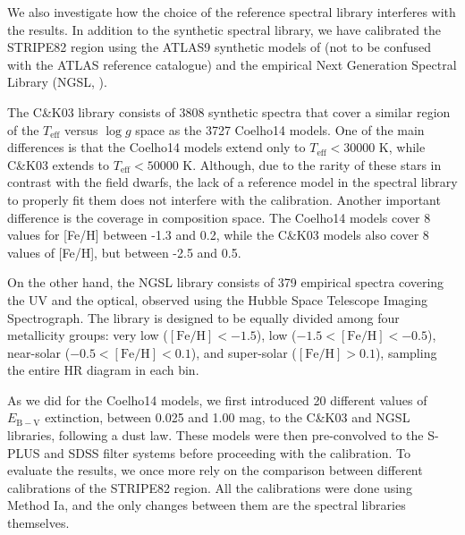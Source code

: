 \documentclass[fleqn,usenatbib]{mnras}
\begin{document}
We also investigate how the choice of the reference spectral library interferes with the results. In addition to the  synthetic spectral library, we have calibrated the STRIPE82 region using the ATLAS9 synthetic models of  (not to be confused with the ATLAS reference catalogue) and the empirical Next Generation Spectral Library (NGSL, \citealp{Gregg+2006, Heap2007}).

The C\&K03 library consists of 3808 synthetic spectra that cover a similar region of the $T_\mathrm{eff}$ versus $\log g$ space as the 3727 Coelho14 models. One of the main differences is that the Coelho14 models extend only to $T_\mathrm{eff} < 30000$ K, while C\&K03 extends to $T_\mathrm{eff} < 50000$ K. Although, due to the rarity of these stars in contrast with the field dwarfs, the lack of a reference model in the spectral library to properly fit them does not interfere with the calibration. Another important difference is the coverage in composition space. The Coelho14 models cover 8 values for [Fe/H] between -1.3 and 0.2, while the C\&K03 models also cover 8 values of [Fe/H], but between -2.5 and 0.5. 

On the other hand, the NGSL library consists of 379 empirical spectra covering the UV and the optical, observed using the Hubble Space Telescope Imaging Spectrograph. The library is designed to be equally divided among four metallicity groups: very low ($\mathrm{[Fe/H]} < -1.5$), low ($-1.5 < \mathrm{[Fe/H]} < -0.5$), near-solar ($-0.5 < \mathrm{[Fe/H]} < 0.1$), and super-solar ($\mathrm{[Fe/H]} > 0.1$), sampling the entire HR diagram in each bin.

As we did for the Coelho14 models, we first introduced 20 different values of $E_\mathrm{B-V}$ extinction, between 0.025 and 1.00 mag, to the C\&K03 and NGSL libraries, following a \citet{Cardelli+1989} dust law. These models were then pre-convolved to the S-PLUS and SDSS filter systems before proceeding with the calibration. To evaluate the results, we once more rely on the comparison between different calibrations of the STRIPE82 region. All the calibrations were done using Method Ia, and the only changes between them are the spectral libraries themselves. 
\end{document}

